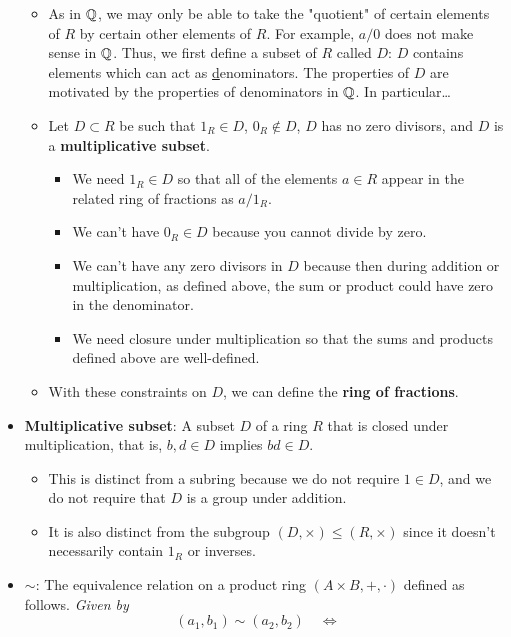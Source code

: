 \documentclass[../notes.tex]{subfiles}
\begin{document}
\begin{itemize}
    \begin{itemize}
        \item As in $\mathbb{Q}$, we may only be able to take the "quotient" of certain elements of $R$ by certain other elements of $R$. For example, $a/0$ does not make sense in $\mathbb{Q}$. Thus, we first define a subset of $R$ called $D$: $D$ contains elements which can act as \underline{d}enominators. The properties of $D$ are motivated by the properties of denominators in $\mathbb{Q}$. In particular\dots
        \item Let $D\subset R$ be such that $1_R\in D$, $0_R\notin D$, $D$ has no zero divisors, and $D$ is a \textbf{multiplicative subset}.
        \begin{itemize}
            \item We need $1_R\in D$ so that all of the elements $a\in R$ appear in the related ring of fractions as $a/1_R$.
            \item We can't have $0_R\in D$ because you cannot divide by zero.
            \item We can't have any zero divisors in $D$ because then during addition or multiplication, as defined above, the sum or product could have zero in the denominator.
            \item We need closure under multiplication so that the sums and products defined above are well-defined.
        \end{itemize}
        \item With these constraints on $D$, we can define the \textbf{ring of fractions}.
    \end{itemize}
    \item \textbf{Multiplicative subset}: A subset $D$ of a ring $R$ that is closed under multiplication, that is, $b,d\in D$ implies $bd\in D$.
    \begin{itemize}
        \item This is distinct from a subring because we do not require $1\in D$, and we do not require that $D$ is a group under addition.
        \item It is also distinct from the subgroup $(D,\times)\leq(R,\times)$ since it doesn't necessarily contain $1_R$ or inverses.
    \end{itemize}
    \item $\bm{\sim}$: The equivalence relation on a product ring $(A\times B,+,\cdot)$ defined as follows. \emph{Given by}
    \begin{equation*}
        (a_1,b_1) \sim (a_2,b_2)
        \quad\Longleftrightarrow\quad

\end{equation*}
\end{itemize}
\end{document}

